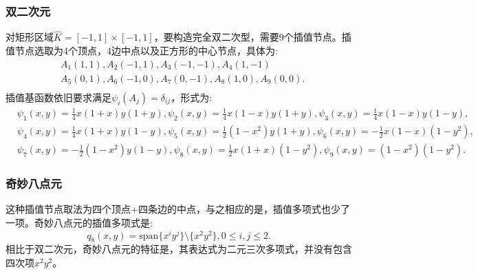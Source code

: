 \subsubsection{双二次元}
对矩形区域$\hat{K}=[-1,1]\times[-1,1]$，要构造完全双二次型，需要9个插值节点。插值节点选取为4个顶点，4边中点以及正方形的中心节点，具体为:
\begin{equation}
    \begin{aligned}
        &A_{1}(1,1),A_{2}(-1,1),A_{3}(-1,-1),A_{4}(1,-1)\\
        &A_{5}(0,1),A_{6}(-1,0),A_{7}(0,-1),A_{8}(1,0),A_{9}(0,0).\\
    \end{aligned}
\end{equation}
插值基函数依旧要求满足$\psi_{i}(A_{j})=\delta_{ij}$，形式为:
\begin{equation}
    \begin{aligned}
        &\psi_{1}(x,y)=\frac{1}{4}x(1+x)y(1+y),\psi_{2}(x,y)=\frac{1}{4}x(1-x)y(1+y),\psi_{3}(x,y)=\frac{1}{4}x(1-x)y(1-y),\\
        &\psi_{4}(x,y)=\frac{1}{4}x(1+x)y(1-y),\psi_{5}(x,y)=\frac{1}{2}(1-x^2)y(1+y),\psi_{6}(x,y)=-\frac{1}{2}x(1-x)(1-y^2),\\
        &\psi_{7}(x,y)=-\frac{1}{2}(1-x^2)y(1-y),\psi_{8}(x,y)=\frac{1}{2}x(1+x)(1-y^2),\psi_{9}(x,y)=(1-x^2)(1-y^2).
    \end{aligned}
\end{equation}
\subsubsection{奇妙八点元}
这种插值节点取法为四个顶点+四条边的中点，与之相应的是，插值多项式也少了一项。奇妙八点元的插值多项式是:
\begin{equation}
    q_{8}(x,y)=\text{span}\{x^{i}y^{j}\}\setminus\{x^{2}y^{2}\},0\le i,j\le 2.
\end{equation}
相比于双二次元，奇妙八点元的特征是，其表达式为二元三次多项式，并没有包含四次项$x^{2}y^{2}$。

